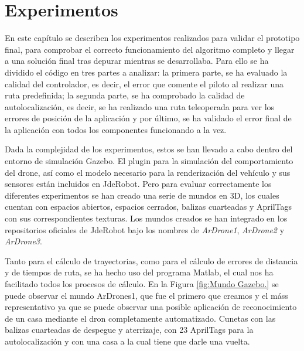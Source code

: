 \chapter{Experimentos}\label{cap.experimentos}
\hspace{1cm} En este capítulo se describen los experimentos realizados para validar el prototipo final, para comprobar el correcto funcionamiento del algoritmo completo y llegar a una solución final tras depurar mientras se desarrollaba. Para ello se ha dividido el código en tres partes a analizar: la primera parte, se ha evaluado la calidad del controlador, es decir, el error que comente el piloto al realizar una ruta predefinida; la segunda parte, se ha comprobado la calidad de autolocalización, es decir, se ha realizado una ruta teleoperada para ver los errores de posición de la aplicación y por último, se ha validado el error final de la aplicación con todos los componentes funcionando a la vez.

\hspace{1cm} Dada la complejidad de los experimentos, estos se han llevado a cabo dentro del entorno de simulación Gazebo. El plugin para la simulación del comportamiento del drone, así como el modelo necesario para la renderización del vehículo y sus sensores están incluidos en JdeRobot. Pero para evaluar correctamente los diferentes experimentos se han creado una serie de mundos en 3D, los cuales cuentan con espacios abiertos, espacios cerrados, balizas cuarteadas y AprilTags con sus correspondientes texturas. Los mundos creados se han integrado en los repositorios oficiales de JdeRobot bajo los nombres de \textit{ArDrone1}, \textit{ArDrone2} y \textit{ArDrone3}.

\hspace{1cm} Tanto para el cálculo de trayectorias, como para el cálculo de errores de distancia y de tiempos de ruta, se ha hecho uso del programa Matlab, el cual nos ha facilitado todos los procesos de cálculo. En la Figura \ref{fig:Mundo Gazebo.} se puede observar el mundo ArDrones1, que fue el primero que creamos y el máss representativo ya que se puede observar una posible aplicación de reconocimiento de un casa mediante el dron completamente automatizado. Cunetas con las balizas cuarteadas de despegue y aterrizaje, con 23 AprilTags para la autolocalización y con una casa a la cual tiene que darle una vuelta.

